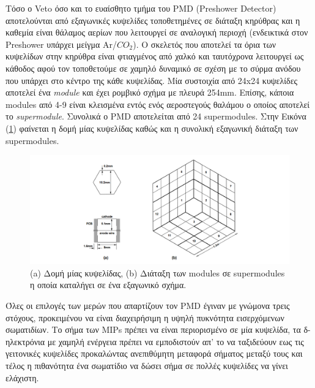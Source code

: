 	Τόσο ο Veto όσο και το ευαίσθητο τμήμα του PMD (Preshower Detector) αποτελούνται από εξαγωνικές κυψελίδες τοποθετημένες σε διάταξη κηρύθρας και η καθεμία είναι θάλαμος αερίων που λειτουργεί σε αναλογική περιοχή (ενδεικτικά στον Preshower υπάρχει μείγμα Ar/$CO_2$). 
	Ο σκελετός που αποτελεί τα όρια των κυψελίδων στην κηρύθρα είναι φτιαγμένος από χαλκό και ταυτόχρονα λειτουργεί ως κάθοδος αφού τον τοποθετούμε σε χαμηλό δυναμικό σε σχέση με το σύρμα ανόδου που υπάρχει στο κέντρο της κάθε κυψελίδας. 
	Μία συστοιχία από 24x24 κυψελίδες αποτελεί ένα \textit{module} και έχει ρομβικό σχήμα με πλευρά 254mm. Επίσης, κάποια modules από 4-9 είναι κλεισμένα εντός ενός αεροστεγούς θαλάμου ο οποίος αποτελεί το \textit{supermodule}. Συνολικά ο PMD αποτελείται από 24 supermodules. Στην Εικόνα (\ref{fig3.25}) φαίνεται η δομή μίας κυψελίδας καθώς και η συνολική εξαγωνική διάταξη των supermodules.
	
	\begin{figure}[h!]
		\centering
		\includegraphics[scale=0.5]{STAR_Detectors/PMD_layout}
		\caption{(a) Δομή μίας κυψελίδας, (b) Διάταξη των modules σε supermodules η οποία καταλήγει σε ένα εξαγωνικό σχήμα.}
		\label{fig3.25}
	\end{figure}
	
	Όλες οι επιλογές των μερών που απαρτίζουν τον PMD έγιναν με γνώμονα τρεις στόχους, προκειμένου να είναι διαχειρήσιμη η υψηλή πυκνότητα εισερχόμενων σωματιδίων. Το σήμα των MIPs πρέπει να είναι περιορισμένο σε μία κυψελίδα, τα δ-ηλεκτρόνια με χαμηλή ενέργεια πρέπει να εμποδιστούν απ' το να ταξιδεύουν εως τις γειτονικές κυψελίδες προκαλώντας ανεπιθύμητη μεταφορά σήματος μεταξύ τους και τέλος η πιθανότητα ένα σωματίδιο να δώσει σήμα σε πολλές κυψελίδες να γίνει ελάχιστη.